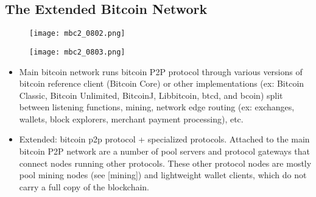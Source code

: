 \documentclass[english, 11pt]{article}
\begin{document}
\subsection{The Extended Bitcoin Network}

\begin{figure}[h]
\centering
\begin{minipage}{.3\textwidth}
  \centering
  \texttt{[image: mbc2\_0802.png]}
\end{minipage}%
\begin{minipage}{.3\textwidth}
  \centering
  \texttt{[image: mbc2\_0803.png]}
\end{minipage}
\end{figure}

\begin{itemize}
    \item Main bitcoin network runs bitcoin P2P protocol through various versions of bitcoin reference client (Bitcoin Core) or other implementations (ex: Bitcoin Classic, Bitcoin Unlimited, BitcoinJ, Libbitcoin, btcd, and bcoin) split between listening functions, mining, network edge routing (ex: exchanges, wallets, block explorers, merchant payment processing), etc.
    \item Extended: bitcoin p2p protocol + specialized protocols.  Attached to the main bitcoin P2P network are a number of pool servers and protocol gateways that connect nodes running other protocols. These other protocol nodes are mostly pool mining nodes (see [mining]) and lightweight wallet clients, which do not carry a full copy of the blockchain.
\end{itemize}
\end{document}
